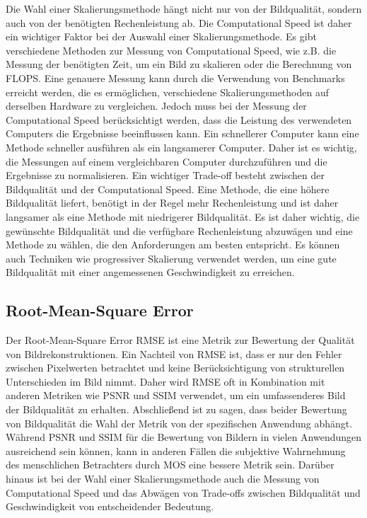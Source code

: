         Die Wahl einer Skalierungsmethode hängt nicht nur von der Bildqualität, sondern auch von der benötigten Rechenleistung ab. 
        Die Computational Speed ist daher ein wichtiger Faktor bei der Auswahl einer Skalierungsmethode.
        Es gibt verschiedene Methoden zur Messung von Computational Speed, wie z.B. die Messung der benötigten Zeit, um ein Bild zu skalieren oder die Berechnung von \ac{FLOPS}. 
        Eine genauere Messung kann durch die Verwendung von Benchmarks erreicht werden, die es ermöglichen, verschiedene Skalierungsmethoden auf derselben Hardware zu vergleichen.
        Jedoch muss bei der Messung der Computational Speed berücksichtigt werden, dass die Leistung des verwendeten Computers die Ergebnisse beeinflussen kann. 
        Ein schnellerer Computer kann eine Methode schneller ausführen als ein langsamerer Computer. 
        Daher ist es wichtig, die Messungen auf einem vergleichbaren Computer durchzuführen und die Ergebnisse zu normalisieren.
        Ein wichtiger Trade-off besteht zwischen der Bildqualität und der Computational Speed. 
        Eine Methode, die eine höhere Bildqualität liefert, benötigt in der Regel mehr Rechenleistung und ist daher langsamer als eine Methode mit niedrigerer Bildqualität. 
        Es ist daher wichtig, die gewünschte Bildqualität und die verfügbare Rechenleistung abzuwägen und eine Methode zu wählen, die den Anforderungen am besten entspricht. 
        Es können auch Techniken wie progressiver Skalierung verwendet werden, um eine gute Bildqualität mit einer angemessenen Geschwindigkeit zu erreichen.
        
    \subsection{Root-Mean-Square Error}
    
        Der Root-Mean-Square Error \ac{RMSE} ist eine Metrik zur Bewertung der Qualität von Bildrekonstruktionen. 
        Ein Nachteil von RMSE ist, dass er nur den Fehler zwischen Pixelwerten betrachtet und keine Berücksichtigung von strukturellen Unterschieden im Bild nimmt. 
        Daher wird RMSE oft in Kombination mit anderen Metriken wie \ac{PSNR} und \ac{SSIM} verwendet, um ein umfassenderes Bild der Bildqualität zu erhalten.
        Abschließend ist zu sagen, dass beider Bewertung von Bildqualität die Wahl der Metrik von der spezifischen Anwendung abhängt. 
        Während \ac{PSNR} und \ac{SSIM} für die Bewertung von Bildern in vielen Anwendungen ausreichend sein können, kann in anderen Fällen die subjektive Wahrnehmung des menschlichen Betrachters durch MOS eine bessere Metrik sein.
        Darüber hinaus ist bei der Wahl einer Skalierungsmethode auch die Messung von Computational Speed und das Abwägen von Trade-offs zwischen Bildqualität und Geschwindigkeit von entscheidender Bedeutung.
        
